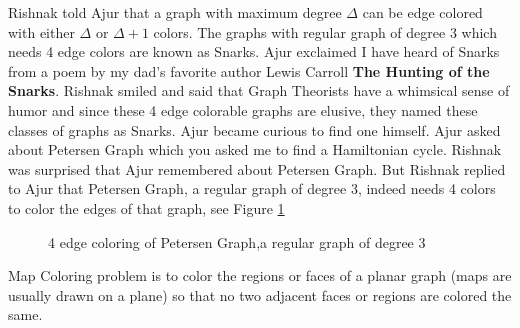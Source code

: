 Rishnak told Ajur that a graph with maximum degree $\Delta$ can be edge colored with either $\Delta$ or $\Delta+1$ colors. The graphs with regular
graph of degree 3 which needs 4 edge colors are known as Snarks. Ajur exclaimed I have heard of Snarks from a poem by my dad's favorite author Lewis Carroll
\textbf{The Hunting of the Snarks}. Rishnak smiled and said that Graph Theorists have a whimsical sense of humor and since these 4 edge colorable graphs are elusive, they named these classes of graphs as Snarks.
Ajur became curious to find one himself. Ajur asked about Petersen Graph which you asked me to find a Hamiltonian cycle. Rishnak was surprised that Ajur remembered about Petersen Graph. But Rishnak replied to Ajur that Petersen Graph, a regular graph of degree 3, indeed needs 4 colors to color the edges of that graph, see Figure \ref{10g7}
\begin{figure}
\begin{center}
\caption{ 4 edge coloring of Petersen Graph,a regular graph of degree 3 }\label{10g7}
\end{center}
\end{figure}

Map Coloring problem is to color the regions or faces of a planar graph (maps are usually drawn on a plane) so that no two adjacent faces or regions are colored the same.




